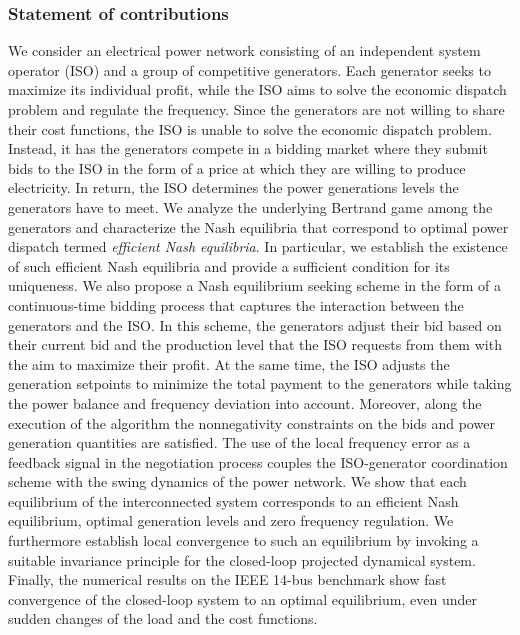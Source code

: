 \documentclass[journal]{IEEEtran}
\newcommand{\1}{\mathds 1}
\theoremstyle{remark}
\theoremstyle{definition}
\begin{document}
\subsubsection*{Statement of contributions}
We consider an electrical power network consisting of an independent
system operator (ISO) and a group of competitive generators. Each
generator seeks to maximize its individual profit, while the ISO aims
to solve the economic dispatch problem and regulate the
frequency. Since the generators are not willing to share their cost
functions, the ISO is unable to solve the economic dispatch
problem. Instead, it has the generators compete in a bidding market
where they submit bids to the ISO in the form of a price at which they
are willing to produce electricity. In return, the ISO determines the
power generations levels the generators have to meet. We analyze the
underlying Bertrand game among the generators and characterize the
Nash equilibria that correspond to optimal power dispatch termed
\emph{efficient Nash equilibria}. In particular, we establish the
existence of such efficient Nash equilibria and provide a sufficient
condition for its uniqueness.  We also propose a Nash equilibrium
seeking scheme in the form of a continuous-time bidding process that
captures the interaction between the generators and the ISO. In this
scheme, the generators adjust their bid based on their current bid and
the production level that the ISO requests from them with the aim to
maximize their profit.  At the same time, the ISO adjusts the
generation setpoints to minimize the total payment to the generators
while taking the power balance and frequency deviation into
account. Moreover, along the execution of the algorithm the
nonnegativity constraints on the bids and power generation quantities
are satisfied.  The use of the local frequency error as a feedback
signal in the negotiation process couples the ISO-generator
coordination scheme with the swing dynamics of the power network. We
show that each equilibrium of the interconnected system corresponds to
an efficient Nash equilibrium, optimal generation levels and zero
frequency regulation. We furthermore establish local convergence to
such an equilibrium by invoking a suitable invariance principle for
the closed-loop projected dynamical system.  Finally, the numerical
results on the IEEE 14-bus benchmark show fast convergence of the
closed-loop system to an optimal equilibrium, even under sudden
changes of the load and the cost functions.
\end{document}
